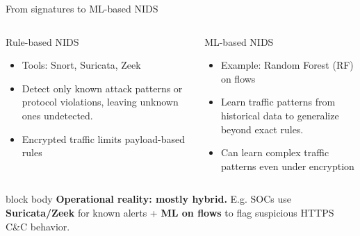 \begin{frame}{From signatures to ML-based NIDS}
	\small
	\begin{columns}[T,onlytextwidth]
		\begin{block}{Rule-based NIDS}
			\begin{itemize}
				\setlength\itemsep{0.6em}
				\item Tools: Snort, Suricata, Zeek
				\item Detect only known attack patterns or protocol violations, leaving unknown ones undetected.
				\item Encrypted traffic limits payload-based rules
			\end{itemize}
		\end{block}

		\begin{block}{ML-based NIDS}
			\begin{itemize}
				\setlength\itemsep{0.6em}
				\item Example: Random Forest (RF) on flows
				\item Learn traffic patterns from historical data to generalize beyond exact rules.
				\item Can learn complex traffic patterns even under encryption
			\end{itemize}
		\end{block}
	\end{columns}

	\vspace{0.25em}
	\begin{beamercolorbox}[wd=\linewidth,sep=0.9ex,rounded=true]{block body}
		\centering
		\textbf{Operational reality: mostly hybrid.} E.g. SOCs use \textbf{Suricata/Zeek} for known alerts + \textbf{ML on flows} to flag suspicious HTTPS C\&C behavior.
	\end{beamercolorbox}

\end{frame}

